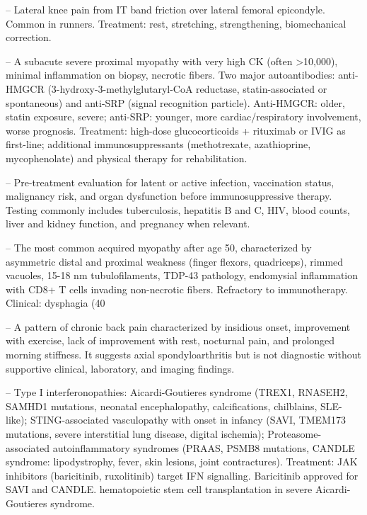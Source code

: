-- Lateral knee pain from IT band friction over lateral femoral epicondyle. Common in runners. Treatment: rest, stretching, strengthening, biomechanical correction.

-- A subacute severe proximal myopathy with very high CK (often >10,000), minimal inflammation on biopsy, necrotic fibers. Two major autoantibodies: anti-HMGCR (3-hydroxy-3-methylglutaryl-CoA reductase, statin-associated or spontaneous) and anti-SRP (signal recognition particle). Anti-HMGCR: older, statin exposure, severe; anti-SRP: younger, more cardiac/respiratory involvement, worse prognosis. Treatment: high-dose glucocorticoids + rituximab or IVIG as first-line; additional immunosuppressants (methotrexate, azathioprine, mycophenolate) and physical therapy for rehabilitation.

-- Pre-treatment evaluation for latent or active infection, vaccination status, malignancy risk, and organ dysfunction before immunosuppressive therapy. Testing commonly includes tuberculosis, hepatitis B and C, HIV, blood counts, liver and kidney function, and pregnancy when relevant.

-- The most common acquired myopathy after age 50, characterized by asymmetric distal and proximal weakness (finger flexors, quadriceps), rimmed vacuoles, 15-18 nm tubulofilaments, TDP-43 pathology, endomysial inflammation with CD8+ T cells invading non-necrotic fibers. Refractory to immunotherapy. Clinical: dysphagia (40%

-- A pattern of chronic back pain characterized by insidious onset, improvement with exercise, lack of improvement with rest, nocturnal pain, and prolonged morning stiffness. It suggests axial spondyloarthritis but is not diagnostic without supportive clinical, laboratory, and imaging findings.

-- Type I interferonopathies: Aicardi-Goutieres syndrome (TREX1, RNASEH2, SAMHD1 mutations, neonatal encephalopathy, calcifications, chilblains, SLE-like); STING-associated vasculopathy with onset in infancy (SAVI, TMEM173 mutations, severe interstitial lung disease, digital ischemia); Proteasome-associated autoinflammatory syndromes (PRAAS, PSMB8 mutations, CANDLE syndrome: lipodystrophy, fever, skin lesions, joint contractures). Treatment: JAK inhibitors (baricitinib, ruxolitinib) target IFN signalling. Baricitinib approved for SAVI and CANDLE. hematopoietic stem cell transplantation in severe Aicardi-Goutieres syndrome.


